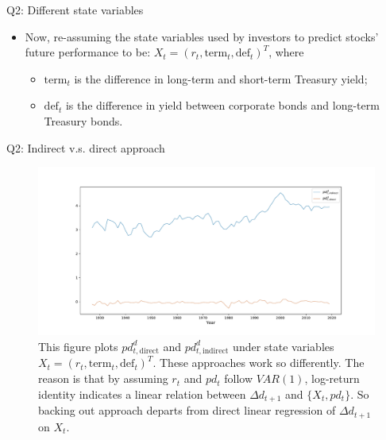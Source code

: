 \documentclass[10pt,t]{beamer}
\begin{document}
\begin{frame}{Q2: Different state variables}
\begin{itemize}
  \item Now, re-assuming the state variables used by investors to predict stocks' future performance to be: $X_t = (r_t, \text{term}_t, \text{def}_t)^T$, where 
  \begin{itemize}
    \item $\text{term}_t$ is the difference in long-term and short-term Treasury yield;
    \item $\text{def}_t$ is the difference in yield between corporate bonds and long-term Treasury bonds.
  \end{itemize}
\end{itemize}
\end{frame}

\begin{frame}{Q2: Indirect v.s. direct approach}
\begin{figure}[h!]
\centering
\includegraphics[width=\linewidth]{q2fig2.pdf}
\caption{This figure plots $pd^{d}_{t, \text{direct}}$ and $pd^{d}_{t, \text{indirect}}$ under state variables $X_t = (r_t, \text{term}_t, \text{def}_t)^T$. These approaches work so differently. The reason is that by assuming $r_t$ and $pd_t$ follow $VAR(1)$, log-return identity indicates a linear relation between $\Delta d_{t+1}$ and $\{X_t, pd_{t}\}$. So backing out approach departs from direct linear regression of $\Delta d_{t+1}$ on $X_t$.}
\end{figure}
\end{frame}
\end{document}
